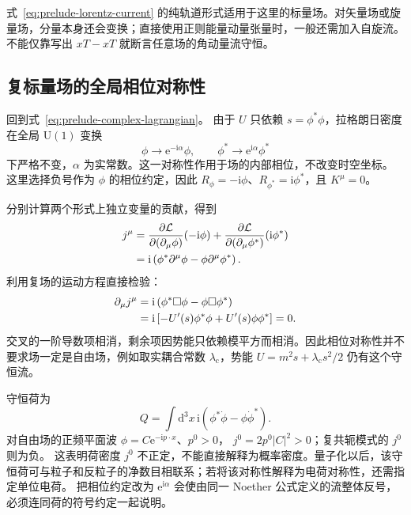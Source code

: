 式~\eqref{eq:prelude-lorentz-current} 的纯轨道形式适用于这里的标量场。对矢量场或旋量场，分量本身还会变换；直接使用正则能量动量张量时，一般还需加入自旋流。不能仅靠写出 $xT-xT$ 就断言任意场的角动量流守恒。

\subsection{复标量场的全局相位对称性}

回到式~\eqref{eq:prelude-complex-lagrangian}。
由于 $U$ 只依赖 $s=\phi^{*}\phi$，拉格朗日密度在全局
$\mathrm{U}(1)$ 变换
\begin{equation}
  \phi\longrightarrow\mathrm{e}^{-\mathrm{i}\alpha}\phi,
  \qquad \phi^{*}\longrightarrow\mathrm{e}^{\mathrm{i}\alpha}\phi^{*}
\end{equation}
下严格不变，$\alpha$ 为实常数。这一对称性作用于场的内部相位，不改变时空坐标。
这里选择负号作为 $\phi$ 的相位约定，因此
$R_{\phi}=-\mathrm{i}\phi$、$R_{\phi^{*}}=\mathrm{i}\phi^{*}$，且 $K^{\mu}=0$。

分别计算两个形式上独立变量的贡献，得到
\begin{align}
  j^{\mu}
  &=\frac{\partial\mathcal{L}}{\partial(\partial_{\mu}\phi)}(-\mathrm{i}\phi)
    +\frac{\partial\mathcal{L}}{\partial(\partial_{\mu}\phi^{*})}(\mathrm{i}\phi^{*})\notag\\
  &=\mathrm{i}\left(\phi^{*}\partial^{\mu}\phi
    -\phi\partial^{\mu}\phi^{*}\right).
  \label{eq:prelude-u1-current}
\end{align}
利用复场的运动方程直接检验：
\begin{align}
  \partial_{\mu}j^{\mu}
  &=\mathrm{i}\left(\phi^{*}\Box\phi-\phi\Box\phi^{*}\right)\notag\\
  &=\mathrm{i}\left[-U'(s)\phi^{*}\phi
    +U'(s)\phi\phi^{*}\right]=0.
\end{align}
交叉的一阶导数项相消，剩余项因势能只依赖模平方而相消。因此相位对称性并不要求场一定是自由场，例如取实耦合常数 $\lambda_{\mathrm{c}}$，势能
$U=m^{2}s+\lambda_{\mathrm{c}}s^{2}/2$ 仍有这个守恒流。

守恒荷为
\begin{equation}
  Q=\int\mathrm{d}^{3}x\,
  \mathrm{i}(\phi^{*}\dot\phi-\phi\dot\phi^{*}).
\end{equation}
对自由场的正频平面波 $\phi=C\mathrm{e}^{-\mathrm{i}p\cdot x}$、$p^{0}>0$，
$j^{0}=2p^{0}|C|^{2}>0$；复共轭模式的 $j^{0}$ 则为负。
这表明荷密度 $j^{0}$ 不正定，不能直接解释为概率密度。量子化以后，该守恒荷可与粒子和反粒子的净数目相联系；若将该对称性解释为电荷对称性，还需指定单位电荷。
把相位约定改为 $\mathrm{e}^{\mathrm{i}\alpha}$ 会使由同一 Noether 公式定义的流整体反号，必须连同荷的符号约定一起说明。


